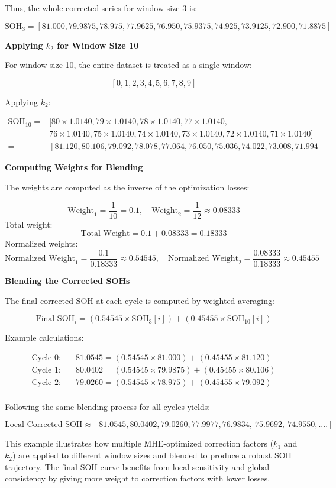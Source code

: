 Thus, the whole corrected series for window size 3 is:

\[
\text{SOH}_3 = [81.000, 79.9875, 78.975, 77.9625, 76.950, 75.9375, 74.925, 73.9125, 72.900, 71.8875]
\]

\textbf{Applying $k_2$ for Window Size 10}

For window size 10, the entire dataset is treated as a single window:

\[
[0,1,2,3,4,5,6,7,8,9]
\]

Applying $k_2$:

\begin{align*}
\text{SOH}_{10} = &[80 \times 1.0140, 79 \times 1.0140, 78 \times 1.0140, 77 \times 1.0140,\\
&76 \times 1.0140, 75 \times 1.0140, 74 \times 1.0140, 73 \times 1.0140, 72 \times 1.0140, 71 \times 1.0140] \\
= &[81.120, 80.106, 79.092, 78.078, 77.064, 76.050, 75.036, 74.022, 73.008, 71.994]
\end{align*}

\textbf{Computing Weights for Blending}

The weights are computed as the inverse of the optimization losses:

\[
\text{Weight}_1 = \frac{1}{10} = 0.1, \quad \text{Weight}_2 = \frac{1}{12} \approx 0.08333
\]
Total weight:
\[
\text{Total Weight} = 0.1 + 0.08333 = 0.18333
\]
Normalized weights:
\[
\text{Normalized Weight}_1 = \frac{0.1}{0.18333} \approx 0.54545, \quad \text{Normalized Weight}_2 = \frac{0.08333}{0.18333} \approx 0.45455
\]

\textbf{Blending the Corrected SOHs}

The final corrected SOH at each cycle is computed by weighted averaging:

\[
\text{Final SOH}_i = (0.54545 \times \text{SOH}_3[i]) + (0.45455 \times \text{SOH}_{10}[i])
\]

Example calculations:

\begin{align*}
\text{Cycle 0}: \quad &81.0545 = (0.54545 \times 81.000) + (0.45455 \times 81.120)\\
\text{Cycle 1}: \quad &80.0402 = (0.54545 \times 79.9875) + (0.45455 \times 80.106)\\
\text{Cycle 2}: \quad &79.0260 = (0.54545 \times 78.975) + (0.45455 \times 79.092)\\
\end{align*}

Following the same blending process for all cycles yields:

\[
\text{Local\_Corrected\_SOH} \approx [81.0545, 80.0402, 79.0260, 77.9977, 76.9834,~75.9692,~74.9550,....]
\]

This example illustrates how multiple MHE-optimized correction factors ($k_1$ and $k_2$) are applied to different window sizes and blended to produce a robust SOH trajectory. The final SOH curve benefits from local sensitivity and global consistency by giving more weight to correction factors with lower losses.
